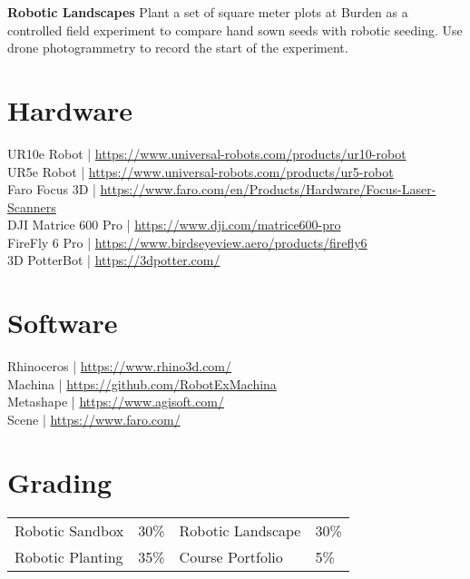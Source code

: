 \documentclass[11pt,article,oneside]{memoir}
\begin{document}
\noindent \textbf{Robotic Landscapes}
Plant a set of square meter plots at Burden
as a controlled field experiment
to compare hand sown seeds with robotic seeding.
Use drone photogrammetry
to record the start of the experiment.
\\

\section{Hardware}
UR10e Robot | \url{https://www.universal-robots.com/products/ur10-robot}\\
UR5e Robot | \url{https://www.universal-robots.com/products/ur5-robot}\\
Faro Focus 3D | \url{https://www.faro.com/en/Products/Hardware/Focus-Laser-Scanners}\\
DJI Matrice 600 Pro | \url{https://www.dji.com/matrice600-pro}\\
FireFly 6 Pro | \url{https://www.birdseyeview.aero/products/firefly6}\\
3D PotterBot | \url{https://3dpotter.com/}\\

\section{Software}
Rhinoceros | \url{https://www.rhino3d.com/}\\
Machina | \url{https://github.com/RobotExMachina}\\
Metashape | \url{https://www.agisoft.com/}\\
Scene | \url{https://www.faro.com/}\\

\section{Grading}
%
\begin{table}[H]
\begin{tabular}{l r @{\hskip 2cm} l @{\hskip 0.5cm} l}
%
Robotic Sandbox & 30\% & Robotic Landscape & 30\% \\
Robotic Planting & 35\%  & Course Portfolio & 5\% \\
%
\end{tabular}
\end{table}
\end{document}
